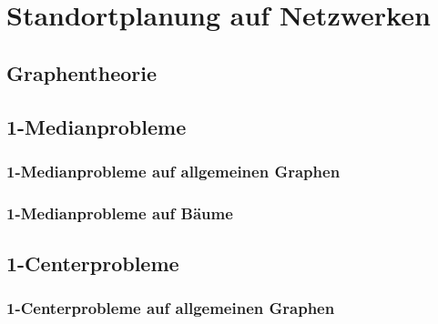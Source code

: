\chapter{Standortplanung auf Netzwerken} %
\label{cha:standortplanung_auf_netzwerken}

      \label{sec:standortplanung_auf_netzwerken}

      \section{Graphentheorie} %
      \label{sec:graphentheorie}
      

      \section{1-Medianprobleme} %
      \label{sec:1_medianprobleme}

        \subsection{1-Medianprobleme auf allgemeinen Graphen} %
        \label{sub:1_medianprobleme_auf_allgemeinen_graphen}
        

        \subsection{1-Medianprobleme auf Bäume} %
        \label{sub:1_medianprobleme_auf_b_ume}
        
      

      \section{1-Centerprobleme} %
      \label{sec:1_centerprobleme}
      
        \subsection{1-Centerprobleme auf allgemeinen Graphen} %
        \label{sub:1_centerprobleme_auf_allgemeinen_graphen}
        

